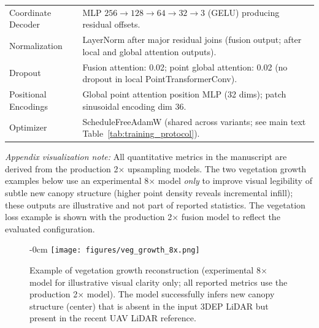 \documentclass[remotesensing,article,accept,pdftex,moreauthors]{Definitions/mdpi}
\renewcommand{\hl}[1]{#1}
\begin{document}
\begin{table}[H]
\begin{tabular}{p{3.2cm} p{10.8cm}}
    \addlinespace
    Coordinate Decoder & MLP $256\rightarrow128\rightarrow64\rightarrow32\rightarrow3$ (GELU) producing residual offsets. \\
    \addlinespace
    Normalization & LayerNorm after major residual joins (fusion output; after local and global attention outputs). \\
    \addlinespace
    Dropout & Fusion attention: 0.02; point global attention: 0.02 (no dropout in local PointTransformerConv). \\
    \addlinespace
    Positional Encodings & Global point attention position MLP (32 dims); patch sinusoidal encoding dim 36. \\
    \addlinespace
    Optimizer & ScheduleFreeAdamW (shared across variants; see main text Table~\ref{tab:training_protocol}). \\
    \bottomrule
  \end{tabular}
\end{table}

\noindent\textit{Appendix visualization note:} All quantitative metrics in the manuscript are derived from the production 2$\times$ upsampling models. The two vegetation growth examples below use an experimental 8$\times$ model \emph{only} to improve visual legibility of subtle new canopy structure (higher point density reveals incremental infill); these outputs are illustrative and not part of reported statistics. The vegetation loss example is shown with the production 2$\times$ fusion model to reflect the evaluated configuration.

\vspace{-12pt}
\begin{figure}[H]
\begin{adjustwidth}{-\extralength}{0cm}
    \centering
    \texttt{[image: figures/veg\_growth\_8x.png]}
    \end{adjustwidth}
  \caption{\hl{Example} %
 of vegetation growth reconstruction (experimental 8$\times$ model for illustrative visual clarity only; all reported metrics use the production 2$\times$ model). The model successfully infers new canopy structure (center) that is absent in the input 3DEP LiDAR but present in the recent UAV LiDAR reference.}
    \label{fig:appendix_growth1}
\end{figure}
\end{document}
